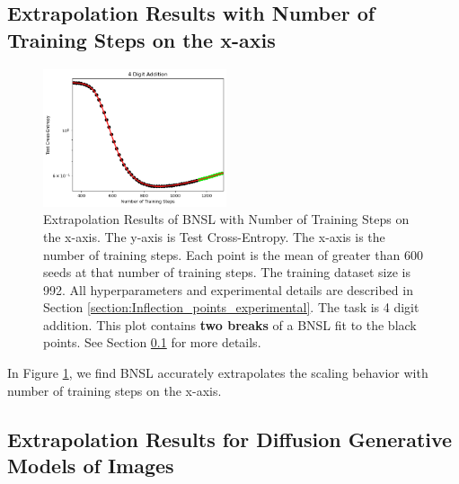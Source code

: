 \documentclass{article} %
\begin{document}
\FloatBarrier

\subsection{Extrapolation Results with Number of Training Steps on the x-axis}
\label{section:steps}

\vspace{-3.5mm}

\begin{figure}[htbp]
    \centering
\includegraphics[width=0.48\textwidth]{figures/num_steps/num_steps.png}

\vspace{-3.5mm}
    \caption{
Extrapolation Results of BNSL with Number of Training Steps on the x-axis. The y-axis is Test Cross-Entropy. The x-axis is the number of training steps. Each point is the mean of greater than 600 seeds at that number of training steps. The training dataset size is 992. All hyperparameters and experimental details are described in Section \ref{section:Inflection_points_experimental}. The task is 4 digit addition. This plot contains \textbf{two breaks} of a BNSL fit to the black points. See Section \ref{section:steps} for more details.
    }
    \label{fig:steps}
\end{figure}

In Figure \ref{fig:steps}, we find BNSL accurately extrapolates the scaling behavior with number of training steps on the x-axis.


\clearpage

\clearpage


\subsection{Extrapolation Results for Diffusion Generative Models of Images}
\label{section:diffusion}
\end{document}
